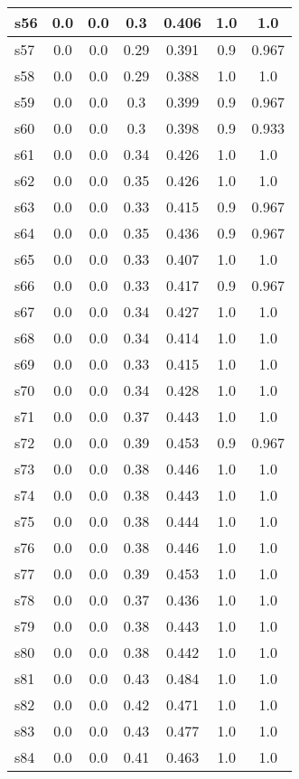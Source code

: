 \documentclass{article}
\begin{document}
\begin{tabular}{|l|c|c|c|c|c|c|}
\hline
s56 &0.0 & 0.0 & 0.3 & 0.406 & 1.0 & 1.0\\
\hline
s57 &0.0 & 0.0 & 0.29 & 0.391 & 0.9 & 0.967\\
\hline
s58 &0.0 & 0.0 & 0.29 & 0.388 & 1.0 & 1.0\\
\hline
s59 &0.0 & 0.0 & 0.3 & 0.399 & 0.9 & 0.967\\
\hline
s60 &0.0 & 0.0 & 0.3 & 0.398 & 0.9 & 0.933\\
\hline
s61 &0.0 & 0.0 & 0.34 & 0.426 & 1.0 & 1.0\\
\hline
s62 &0.0 & 0.0 & 0.35 & 0.426 & 1.0 & 1.0\\
\hline
s63 &0.0 & 0.0 & 0.33 & 0.415 & 0.9 & 0.967\\
\hline
s64 &0.0 & 0.0 & 0.35 & 0.436 & 0.9 & 0.967\\
\hline
s65 &0.0 & 0.0 & 0.33 & 0.407 & 1.0 & 1.0\\
\hline
s66 &0.0 & 0.0 & 0.33 & 0.417 & 0.9 & 0.967\\
\hline
s67 &0.0 & 0.0 & 0.34 & 0.427 & 1.0 & 1.0\\
\hline
s68 &0.0 & 0.0 & 0.34 & 0.414 & 1.0 & 1.0\\
\hline
s69 &0.0 & 0.0 & 0.33 & 0.415 & 1.0 & 1.0\\
\hline
s70 &0.0 & 0.0 & 0.34 & 0.428 & 1.0 & 1.0\\
\hline
s71 &0.0 & 0.0 & 0.37 & 0.443 & 1.0 & 1.0\\
\hline
s72 &0.0 & 0.0 & 0.39 & 0.453 & 0.9 & 0.967\\
\hline
s73 &0.0 & 0.0 & 0.38 & 0.446 & 1.0 & 1.0\\
\hline
s74 &0.0 & 0.0 & 0.38 & 0.443 & 1.0 & 1.0\\
\hline
s75 &0.0 & 0.0 & 0.38 & 0.444 & 1.0 & 1.0\\
\hline
s76 &0.0 & 0.0 & 0.38 & 0.446 & 1.0 & 1.0\\
\hline
s77 &0.0 & 0.0 & 0.39 & 0.453 & 1.0 & 1.0\\
\hline
s78 &0.0 & 0.0 & 0.37 & 0.436 & 1.0 & 1.0\\
\hline
s79 &0.0 & 0.0 & 0.38 & 0.443 & 1.0 & 1.0\\
\hline
s80 &0.0 & 0.0 & 0.38 & 0.442 & 1.0 & 1.0\\
\hline
s81 &0.0 & 0.0 & 0.43 & 0.484 & 1.0 & 1.0\\
\hline
s82 &0.0 & 0.0 & 0.42 & 0.471 & 1.0 & 1.0\\
\hline
s83 &0.0 & 0.0 & 0.43 & 0.477 & 1.0 & 1.0\\
\hline
s84 &0.0 & 0.0 & 0.41 & 0.463 & 1.0 & 1.0\\

\end{tabular}
\end{document}
